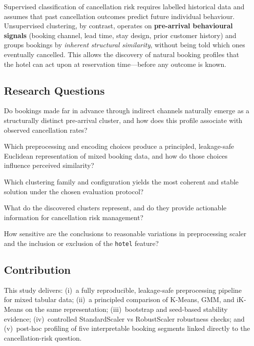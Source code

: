 \documentclass[12pt,a4paper]{article}
\begin{document}
Supervised classification of cancellation risk requires labelled historical
data and assumes that past cancellation outcomes predict future individual
behaviour. Unsupervised clustering, by contrast, operates on
\textbf{pre-arrival behavioural signals} (booking channel, lead time, stay
design, prior customer history) and groups bookings by
\emph{inherent structural similarity}, without being told which ones
eventually cancelled.
This allows the discovery of natural booking profiles that the hotel can
act upon at reservation time---before any outcome is known.

\subsection*{Research Questions}

\begin{description}[leftmargin=1.5em]
  \item[RQ1 (Framing).] Do bookings made far in advance through indirect
        channels naturally emerge as a structurally distinct pre-arrival
        cluster, and how does this profile associate with observed
        cancellation rates?
  \item[RQ2 (Representation).] Which preprocessing and encoding choices
        produce a principled, leakage-safe Euclidean representation of
        mixed booking data, and how do those choices influence perceived
        similarity?
  \item[RQ3 (Modelling).] Which clustering family and configuration yields
        the most coherent and stable solution under the chosen evaluation
        protocol?
  \item[RQ4 (Interpretation).] What do the discovered clusters represent,
        and do they provide actionable information for cancellation risk
        management?
  \item[RQ5 (Robustness).] How sensitive are the conclusions to
        reasonable variations in preprocessing scaler and the inclusion or
        exclusion of the \texttt{hotel} feature?
\end{description}

\subsection*{Contribution}

This study delivers: (i)~a fully reproducible, leakage-safe preprocessing
pipeline for mixed tabular data; (ii)~a principled comparison of K-Means,
GMM, and iK-Means on the same representation; (iii)~bootstrap and
seed-based stability evidence; (iv)~controlled StandardScaler vs
RobustScaler robustness checks; and (v)~post-hoc profiling of five
interpretable booking segments linked directly to the cancellation-risk
question.
\end{document}
